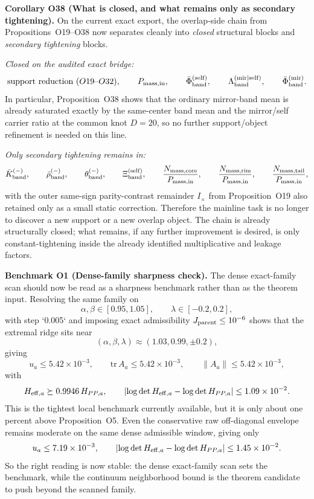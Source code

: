 \documentclass[aps,prd,onecolumn,notitlepage,nofootinbib,superscriptaddress,11pt,floatfix]{revtex4-2}
\begin{document}
\medskip\noindent\textbf{Corollary O38 (What is closed, and what remains only as secondary tightening).}
On the current exact export, the overlap-side chain from Propositions~O19--O38 now separates cleanly into \emph{closed} structural blocks and \emph{secondary tightening} blocks.

\emph{Closed on the audited exact bridge:}
\[
\text{support reduction }(O19\text{--}O32),\qquad
P_{\rm mass,in},\qquad
\bar\Phi_{\rm band}^{\rm(self)},\qquad
\Lambda_{\rm band}^{\rm(mir|self)},\qquad
\bar\Phi_{\rm band}^{\rm(mir)}.
\]
In particular, Proposition~O38 shows that the ordinary mirror-band mean is already saturated exactly by the same-center band mean and the mirror/self carrier ratio at the common knot \(D=20\), so no further support/object refinement is needed on this line.

\emph{Only secondary tightening remains in:}
\[
\bar K_{\rm band}^{(-)},\qquad
\bar\rho_{\rm band}^{(-)},\qquad
\theta_{\rm band}^{(-)},\qquad
\Xi_{\rm band}^{\rm(self)},\qquad
\frac{N_{\rm mass,core}}{P_{\rm mass,in}},\qquad
\frac{N_{\rm mass,rim}}{P_{\rm mass,in}},\qquad
\frac{N_{\rm mass,tail}}{P_{\rm mass,in}},
\]
with the outer same-sign parity-contrast remainder \(I_\times\) from Proposition~O19 also retained only as a small static correction. Therefore the mainline task is no longer to discover a new support or a new overlap object. The chain is already structurally closed; what remains, if any further improvement is desired, is only constant-tightening inside the already identified multiplicative and leakage factors.

\medskip\noindent\textbf{Benchmark O1 (Dense-family sharpness check).}
The dense exact-family scan should now be read as a sharpness benchmark rather than as the theorem input. Resolving the same family on
\[
\alpha,\beta\in[0.95,1.05],
\qquad
\lambda\in[-0.2,0.2],
\]
with step `0.005` and imposing exact admissibility $J_{\rm parent}\le 10^{-6}$ shows that the extremal ridge sits near
\[
(\alpha,\beta,\lambda)\approx(1.03,0.99,\pm0.2),
\]
giving
\[
u_a\le 5.42\times10^{-3},
\qquad
\mathrm{tr}\,A_a\le 5.42\times10^{-3},
\qquad
\|A_a\|\le 5.42\times10^{-3},
\]
with
\[
H_{{\rm eff},a}\succeq 0.9946\,H_{PP,a},
\qquad
\left|\log\det H_{{\rm eff},a}-\log\det H_{PP,a}\right|
\le 1.09\times10^{-2}.
\]
This is the tightest local benchmark currently available, but it is only about one percent above Proposition~O5. Even the conservative raw off-diagonal envelope remains moderate on the same dense admissible window, giving only
\[
u_a\le 7.19\times10^{-3},
\qquad
\left|\log\det H_{{\rm eff},a}-\log\det H_{PP,a}\right|
\le 1.45\times10^{-2}.
\]
So the right reading is now stable: the dense exact-family scan sets the benchmark, while the continuum neighborhood bound is the theorem candidate to push beyond the scanned family.
\end{document}
